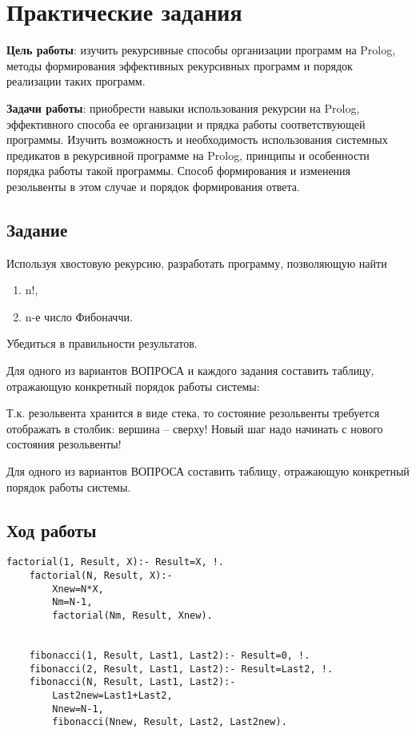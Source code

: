 \chapter{Практические задания}

\textbf{Цель работы}: изучить рекурсивные способы организации программ на Prolog,
методы формирования эффективных рекурсивных программ и порядок реализации таких программ.

\textbf{Задачи работы}: приобрести навыки использования рекурсии на Prolog, эффективного
способа ее организации и прядка работы соответствующей программы.
Изучить возможность и необходимость использования системных предикатов в рекурсивной
программе на Prolog, принципы и особенности порядка работы такой программы. Способ
формирования и изменения резольвенты в этом случае и порядок формирования ответа.

\section*{Задание}

Используя хвостовую рекурсию, разработать программу, позволяющую найти

\begin{enumerate}[label=\arabic*.]
	\item n!,
	\item n-е число Фибоначчи.
\end{enumerate}

Убедиться в правильности результатов.

Для одного из вариантов ВОПРОСА и каждого задания составить таблицу, отражающую
конкретный порядок работы системы:

Т.к. резольвента хранится в виде стека, то состояние резольвенты требуется отображать в
столбик: вершина – сверху! Новый шаг надо начинать с нового состояния резольвенты!

Для одного из вариантов ВОПРОСА составить таблицу, отражающую конкретный порядок работы системы.

\pagebreak

\section*{Ход работы}

\begin{center}
	\begin{lstlisting}[caption=Описательные разделы программы]
	factorial(1, Result, X):- Result=X, !.
	factorial(N, Result, X):-
		Xnew=N*X,
		Nm=N-1,
		factorial(Nm, Result, Xnew).


	fibonacci(1, Result, Last1, Last2):- Result=0, !.
	fibonacci(2, Result, Last1, Last2):- Result=Last2, !.
	fibonacci(N, Result, Last1, Last2):-
		Last2new=Last1+Last2,
		Nnew=N-1,
		fibonacci(Nnew, Result, Last2, Last2new).
	\end{lstlisting}
\end{center}


